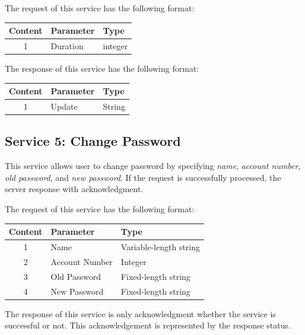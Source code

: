 \documentclass[12pt]{article}
\begin{document}
The request of this service has the following format:

\noindent\begin{minipage}{\linewidth}
	\centering
	\begin{tabular}{c l l}
    \hline
    \textbf{Content} & \textbf{Parameter} & \textbf{Type}\\
    \hline
    1 & Duration & integer \\
    \hline
	\end{tabular}
\end{minipage}

The response of this service has the following format:

\noindent\begin{minipage}{\linewidth}
	\centering
	\begin{tabular}{c l l}
  	\hline
    \textbf{Content} & \textbf{Parameter} & \textbf{Type}\\
    \hline
    1 & Update & String \\
    \hline
	\end{tabular}
\end{minipage}

\subsection{Service 5: Change Password}
This service allows user to change password by specifying \textit{name}, \textit{account number}, \textit{old password}, and \textit{new password}. If the request is successfully processed, the server response with acknowledgment.

The request of this service has the following format:

\noindent\begin{minipage}{\linewidth}
	\centering
	\begin{tabular}{c l l}
    \hline
    \textbf{Content} & \textbf{Parameter} & \textbf{Type}\\
    \hline
    1 & Name & Variable-length string \\
    2 & Account Number & Integer \\
    3 & Old Password & Fixed-length string \\
    4 & New Password & Fixed-length string \\
    \hline
	\end{tabular}
\end{minipage}

The response of this service is only acknowledgment whether the service is successful or not. This acknowledgement is represented by the response status.
\end{document}

